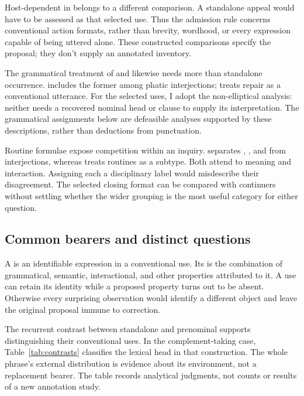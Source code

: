 \documentclass[12pt]{article}
\begin{document}
Host-dependent  in  belongs to
a different comparison. A standalone appeal  would have
to be assessed as that selected use. Thus the admission rule concerns
conventional action formats, rather than brevity, wordhood, or every
expression capable of being uttered alone. These constructed comparisons
specify the proposal; they don't supply an annotated inventory.

The grammatical treatment of  and  likewise
needs more than standalone occurrence. \textcite[114]{ameka1992} includes the former among
phatic interjections; \textcite[152]{wilkins1992} treats repair 
as a conventional utterance.
For the selected uses, I adopt the non-elliptical analysis: neither needs
a recovered nominal head or clause to supply its interpretation.
The grammatical assignments below are defeasible analyses supported by
these descriptions, rather than deductions from punctuation.

Routine formulae expose competition within an inquiry.
\textcite[108--110]{ameka1992} separates , ,
and  from interjections, whereas
\textcite[142]{wilkins1992} treats routines as a subtype. Both attend
to meaning and interaction. Assigning each a disciplinary label would
misdescribe their disagreement. The selected closing format can be
compared with continuers without settling whether the wider grouping
is the most useful category for either question.

\subsection{Common bearers and distinct questions}

A  is an identifiable expression in a conventional use.
Its  is the combination of grammatical, semantic, interactional,
and other properties attributed to it. A use can retain its identity
while a proposed property turns out to be absent. Otherwise every
surprising observation would identify a different object and leave the
original proposal immune to correction.

The recurrent contrast between standalone and prenominal 
supports distinguishing their conventional uses. In the complement-taking
case, Table~\ref{tab:contrasts} classifies the lexical head 
in that construction. The whole phrase's external distribution is evidence
about its environment, not a replacement bearer. The table records
analytical judgments, not counts or results of a new annotation study.
\end{document}
